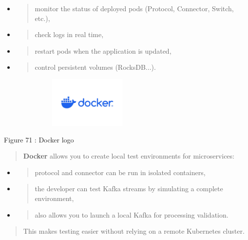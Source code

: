 \documentclass[12pt,a4paper]{report}
\begin{document}
\begin{itemize}
\item
  \begin{quote}
  monitor the status of deployed pods (Protocol, Connector, Switch,
  etc.),
  \end{quote}
\item
  \begin{quote}
  check logs in real time,
  \end{quote}
\item
  \begin{quote}
  restart pods when the application is updated,
  \end{quote}
\item
  \begin{quote}
  control persistent volumes (RocksDB...).
  \end{quote}
\end{itemize}

\includegraphics[width=3.55984in,height=1in]{vertopal_d1b0b2209edd4c6aa8254f57daa0953b/media/image90.png}

\protect\hypertarget{_Toc201954547}{}{}Figure 71 : Docker logo

\begin{quote}
\textbf{Docker} allows you to create local test environments for
microservices:
\end{quote}

\begin{itemize}
\item
  \begin{quote}
  protocol and connector can be run in isolated containers,
  \end{quote}
\item
  \begin{quote}
  the developer can test Kafka streams by simulating a complete
  environment,
  \end{quote}
\item
  \begin{quote}
  also allows you to launch a local Kafka for processing validation.
  \end{quote}
\end{itemize}

\begin{quote}
This makes testing easier without relying on a remote Kubernetes
cluster.
\end{quote}
\end{document}

